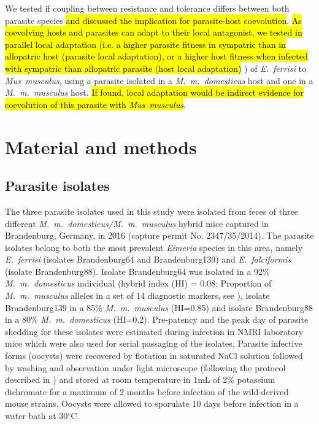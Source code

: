 \documentclass[12pt]{article}
\begin{document}
\par
We tested if coupling between resistance and tolerance differs between both parasite species \hl{and discussed the implication for parasite-host coevolution}. \hl{As coevolving hosts and parasites can adapt to their local antagonist, we tested in parallel local adaptation (i.e. a higher parasite fitness in sympatric than in allopatric host (parasite local adaptation), or a higher host fitness when infected with sympatric than allopatric parasite (host local adaptation)} \citep{schulte_host_2011}) of \textit{E.~ferrisi} to \textit{Mus~musculus}, using a parasite isolated in a \textit{M.~m.~domesticus} host and one in a \textit{M.~m.~musculus} host. \hl{If found, local adaptation would be indirect evidence for coevolution of this parasite with \textit{Mus~musculus}}.

\section*{Material and methods}

\subsection{Parasite isolates}

The three parasite isolates used in this study were isolated from feces of three different \textit{M.~m.~domesticus/M.~m.~musculus} hybrid mice captured in Brandenburg, Germany, in 2016 (capture permit No. 2347/35/2014). The parasite isolates belong to both the most prevalent \textit{Eimeria }species in this area, namely \textit{E.~ferrisi }(isolates Brandenburg64 and Brandenburg139) and \textit{E.~falciformis }(isolate Brandenburg88)\citep{jarquin-diaz_detection_2019}. Isolate Brandenburg64 was isolated in a 92\% \textit{M.~m.~domesticus} individual (hybrid index (HI) = 0.08: Proportion of \textit{M.~m.~musculus} alleles in a set of 14 diagnostic markers, see \cite{Balard2020}), isolate Brandenburg139 in a 85\% \textit{M.~m.~musculus} (HI=0.85) and isolate Brandenburg88 in a 80\% \textit{M.~m.~domesticus} (HI=0.2). Pre-patency and the peak day of parasite shedding for these isolates were estimated during infection in NMRI laboratory mice \citep{al-khlifeh_eimeria_2019} which were also used for serial passaging of the isolates. Parasite infective forms (oocysts) were recovered by flotation in saturated NaCl solution followed by washing and observation under light microscope (following the protocol described in \cite{clerc_parasitic_2019}) and stored at room temperature in 1mL of 2\% potassium dichromate for a maximum of 2 months before infection of the wild-derived mouse strains. Oocysts were allowed to sporulate 10 days before infection in a water bath at 30$^{\circ}$C.\par
\end{document}
